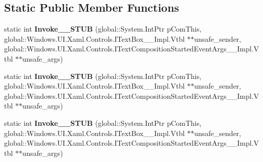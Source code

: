 \subsection*{Static Public Member Functions}
\begin{DoxyCompactItemize}
\item 
\mbox{\label{struct_windows_1_1_foundation_1_1_typed_event_handler___a___windows___u_i___xaml___controls___tecddfdbbe1975f56736362b195b332de6_a5efcbc4a1e1efc722cbccaa1da902fcb}} 
static int {\bfseries Invoke\+\_\+\+\_\+\+S\+T\+UB} (global\+::\+System.\+Int\+Ptr p\+Com\+This, global\+::\+Windows.\+U\+I.\+Xaml.\+Controls.\+I\+Text\+Box\+\_\+\+\_\+\+Impl.\+Vtbl $\ast$$\ast$unsafe\+\_\+sender, global\+::\+Windows.\+U\+I.\+Xaml.\+Controls.\+I\+Text\+Composition\+Started\+Event\+Args\+\_\+\+\_\+\+Impl.\+Vtbl $\ast$$\ast$unsafe\+\_\+args)
\item 
\mbox{\label{struct_windows_1_1_foundation_1_1_typed_event_handler___a___windows___u_i___xaml___controls___tecddfdbbe1975f56736362b195b332de6_a5efcbc4a1e1efc722cbccaa1da902fcb}} 
static int {\bfseries Invoke\+\_\+\+\_\+\+S\+T\+UB} (global\+::\+System.\+Int\+Ptr p\+Com\+This, global\+::\+Windows.\+U\+I.\+Xaml.\+Controls.\+I\+Text\+Box\+\_\+\+\_\+\+Impl.\+Vtbl $\ast$$\ast$unsafe\+\_\+sender, global\+::\+Windows.\+U\+I.\+Xaml.\+Controls.\+I\+Text\+Composition\+Started\+Event\+Args\+\_\+\+\_\+\+Impl.\+Vtbl $\ast$$\ast$unsafe\+\_\+args)
\item 
\mbox{\label{struct_windows_1_1_foundation_1_1_typed_event_handler___a___windows___u_i___xaml___controls___tecddfdbbe1975f56736362b195b332de6_a5efcbc4a1e1efc722cbccaa1da902fcb}} 
static int {\bfseries Invoke\+\_\+\+\_\+\+S\+T\+UB} (global\+::\+System.\+Int\+Ptr p\+Com\+This, global\+::\+Windows.\+U\+I.\+Xaml.\+Controls.\+I\+Text\+Box\+\_\+\+\_\+\+Impl.\+Vtbl $\ast$$\ast$unsafe\+\_\+sender, global\+::\+Windows.\+U\+I.\+Xaml.\+Controls.\+I\+Text\+Composition\+Started\+Event\+Args\+\_\+\+\_\+\+Impl.\+Vtbl $\ast$$\ast$unsafe\+\_\+args)
\item 

\end{DoxyCompactItemize}
